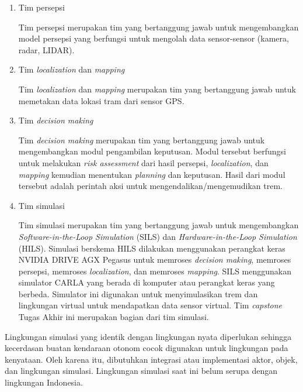 \begin{enumerate}

    \item Tim persepsi

    Tim persepsi merupakan tim yang bertanggung jawab untuk mengembangkan model
    persepsi yang berfungsi untuk mengolah data sensor-sensor (kamera, radar,
    LIDAR).

    \item Tim \textit{localization} dan \textit{mapping}

    Tim \textit{localization} dan \textit{mapping} merupakan tim yang
    bertanggung jawab untuk memetakan data lokasi tram dari sensor GPS.

    \item Tim \textit{decision making}

    Tim \textit{decision making} merupakan tim yang bertanggung jawab untuk
    mengembangkan modul pengambilan keputusan. Modul tersebut berfungsi untuk
    melakukan \textit{risk assessment} dari hasil persepsi,
    \textit{localization}, dan \textit{mapping} kemudian menentukan
    \textit{planning} dan keputusan. Hasil dari modul tersebut adalah perintah
    aksi untuk mengendalikan/mengemudikan trem.

    \item Tim simulasi

    Tim simulasi merupakan tim yang bertanggung jawab untuk mengembangkan
    \textit{Software-in-the-Loop Simulation} (SILS) dan
    \textit{Hardware-in-the-Loop Simulation} (HILS). Simulasi berskema HILS
    dilakukan menggunakan perangkat keras NVIDIA DRIVE AGX Pegasus untuk
    memroses \textit{decision making}, memroses persepsi, memroses
    \textit{localization}, dan memroses \textit{mapping}. SILS menggunakan
    simulator CARLA yang berada di komputer atau perangkat keras yang berbeda.
    Simulator ini digunakan untuk menyimulasikan trem dan lingkungan virtual
    untuk mendapatkan data sensor virtual. Tim \textit{capstone} Tugas Akhir ini
    merupakan bagian dari tim simulasi.

\end{enumerate}

Lingkungan simulasi yang identik dengan lingkungan nyata diperlukan sehingga
kecerdasan buatan kendaraan otonom cocok digunakan untuk lingkungan pada
kenyataan. Oleh karena itu, dibutuhkan integrasi atau implementasi aktor, objek,
dan lingkungan simulasi. Lingkungan simulasi saat ini belum serupa dengan
lingkungan Indonesia.

